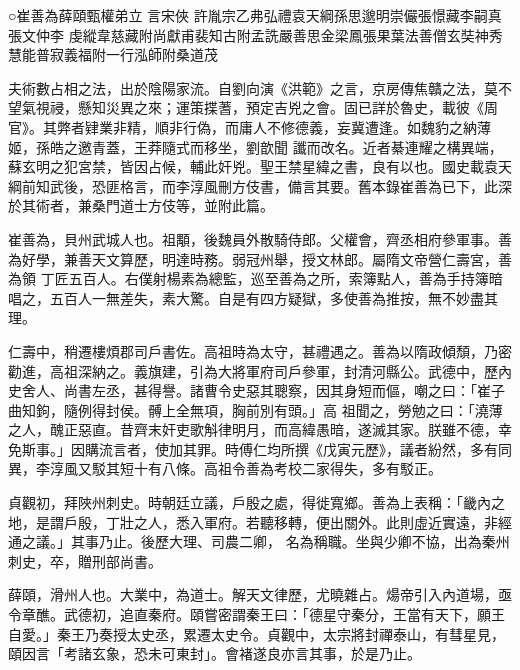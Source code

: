
\begin{pinyinscope}

 ○崔善為薛頤甄權弟立
 言宋俠
 許胤宗乙弗弘禮袁天綱孫思邈明崇儼張憬藏李嗣真張文仲李
 虔縱韋慈藏附尚獻甫裴知古附孟詵嚴善思金梁鳳張果葉法善僧玄奘神秀慧能普寂義福附一行泓師附桑道茂



 夫術數占相之法，出於陰陽家流。自劉向演《洪範》之言，京房傳焦贛之法，莫不望氣視祲，懸知災異之來；運策揲蓍，預定吉兇之會。固已詳於魯史，載彼《周官》。其弊者肄業非精，順非行偽，而庸人不修德義，妄冀遭逢。如魏豹之納薄姬，孫皓之邀青蓋，王莽隨式而移坐，劉歆聞
 讖而改名。近者綦連耀之構異端，蘇玄明之犯宮禁，皆因占候，輔此奸兇。聖王禁星緯之書，良有以也。國史載袁天綱前知武後，恐匪格言，而李淳風刪方伎書，備言其要。舊本錄崔善為已下，此深於其術者，兼桑門道士方伎等，並附此篇。



 崔善為，貝州武城人也。祖顒，後魏員外散騎侍郎。父權會，齊丞相府參軍事。善為好學，兼善天文算歷，明達時務。弱冠州舉，授文林郎。屬隋文帝營仁壽宮，善為領
 丁匠五百人。右僕射楊素為總監，巡至善為之所，索簿點人，善為手持簿暗唱之，五百人一無差失，素大驚。自是有四方疑獄，多使善為推按，無不妙盡其理。



 仁壽中，稍遷樓煩郡司戶書佐。高祖時為太守，甚禮遇之。善為以隋政傾頹，乃密勸進，高祖深納之。義旗建，引為大將軍府司戶參軍，封清河縣公。武德中，歷內史舍人、尚書左丞，甚得譽。諸曹令史惡其聰察，因其身短而傴，嘲之曰：「崔子曲知鉤，隨例得封侯。髆上全無項，胸前別有頭。」高
 祖聞之，勞勉之曰：「澆薄之人，醜正惡直。昔齊末奸吏歌斛律明月，而高緯愚暗，遂滅其家。朕雖不德，幸免斯事。」因購流言者，使加其罪。時傅仁均所撰《戊寅元歷》，議者紛然，多有同異，李淳風又駁其短十有八條。高祖令善為考校二家得失，多有駁正。



 貞觀初，拜陜州刺史。時朝廷立議，戶殷之處，得徙寬鄉。善為上表稱：「畿內之地，是謂戶殷，丁壯之人，悉入軍府。若聽移轉，便出關外。此則虛近實遠，非經通之議。」其事乃止。後歷大理、司農二卿，
 名為稱職。坐與少卿不協，出為秦州刺史，卒，贈刑部尚書。



 薛頤，滑州人也。大業中，為道士。解天文律歷，尤曉雜占。煬帝引入內道場，亟令章醮。武德初，追直秦府。頤嘗密謂秦王曰：「德星守秦分，王當有天下，願王自愛。」秦王乃奏授太史丞，累遷太史令。貞觀中，太宗將封禪泰山，有彗星見，頤因言「考諸玄象，恐未可東封」。會褚遂良亦言其事，於是乃止。




\end{pinyinscope}
